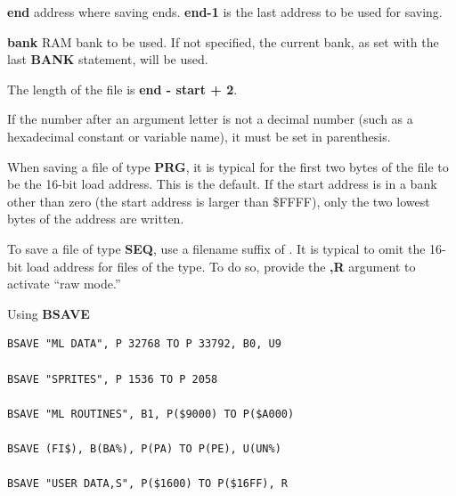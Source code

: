 \begin{description}[leftmargin=2cm,style=nextline]
                  {\bf end} address where saving ends. {\bf end-1} is the last address to be used for saving.

                  {\bf bank} RAM bank to be used. If not specified, the current bank, as set with the last {\bf BANK} statement, will be used.

                  \drivedefinition

                  \unitdefinition

\item [Remarks:]  The length of the file is {\bf end - start + 2}.

                  If the number after an argument letter is not a decimal number (such as a hexadecimal constant or variable name), it must be set in parenthesis.

                  When saving a file of type {\bf PRG}, it is typical for the first two bytes of the file to be the 16-bit load address. This is the default. If the start address is in a bank other than zero (the start address is larger than \$FFFF), only the two lowest bytes of the address are written.

                  To save a file of type {\bf SEQ}, use a filename suffix of . It is typical to omit the 16-bit load address for files of the type. To do so, provide the {\bf ,R} argument to activate ``raw mode.''

\item [Examples:] Using {\bf BSAVE}

\begin{tcolorbox}[colback=black,coltext=white]
\verbatimfont{\codefont}
\begin{verbatim}
BSAVE "ML DATA", P 32768 TO P 33792, B0, U9

BSAVE "SPRITES", P 1536 TO P 2058

BSAVE "ML ROUTINES", B1, P($9000) TO P($A000)

BSAVE (FI$), B(BA%), P(PA) TO P(PE), U(UN%)

BSAVE "USER DATA,S", P($1600) TO P($16FF), R
\end{verbatim}
\end{tcolorbox}
\end{description}


\newpage
